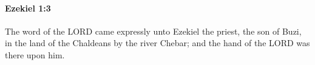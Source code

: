 
		\paragraph{Ezekiel 1:3} %
			\label{EZEKIEL-1-3}

			The word of the LORD came expressly unto Ezekiel the priest, the son of Buzi, in the land of the Chaldeans by the river Chebar; and the hand of the LORD was there upon him.


